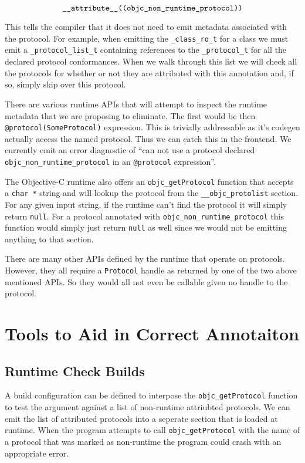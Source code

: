 \documentclass{article}
\begin{document}
\[ \verb|__attribute__((objc_non_runtime_protocol))| \]

This tells the compiler that it does not need to emit metadata associated with
the protocol. For example, when emitting the \verb|_class_ro_t| for a class we
must emit a \verb|_protocol_list_t| containing references to the
\verb|_protocol_t| for all the declared protocol conformances. When we walk
through this list we will check all the protocols for whether or not they are
attributed with this annotation and, if so, simply skip over this protocol.

There are various runtime APIs that will attempt to inspect the runtime metadata
that we are proposing to eliminate. The first would be then \linebreak
\verb|@protocol(SomeProtocol)| expression. This is trivially addressable as it's
codegen actually access the named protocol. Thus we can catch this in the
frontend. We currently emit an error diagnostic of ``can not use a protocol
declared \verb|objc_non_runtime_protocol| in an \verb|@protocol| expression''.

The Objective-C runtime also offers an \verb|objc_getProtocol| function that
accepts a \verb|char *| string and will lookup the protocol from the
\verb|__objc_protolist| section. For any given input string, if the
runtime can't find the protocol it will simply return \verb|null|. For a protocol
annotated with \verb|objc_non_runtime_protocol| this function would simply just
return \verb|null| as well since we would not be emitting anything to that
section.

There are many other APIs defined by the runtime that operate on protocols.
However, they all require a \verb|Protocol| handle as returned by one of the two
above mentioned APIs. So they would all not even be callable given no handle to
the protocol.

\section{Tools to Aid in Correct Annotaiton}

\subsection{Runtime Check Builds}

A build configuration can be defined to interpose the \verb|objc_getProtocol|
function to test the argument against a list of non-runtime attriubted protocols.
We can emit the list of attributed protocols into a seperate section that is
loaded at runtime. When the program attempts to call \verb|objc_getProtocol|
with the name of a protocol that was marked as non-runtime the program could
crash with an appropriate error.
\end{document}
